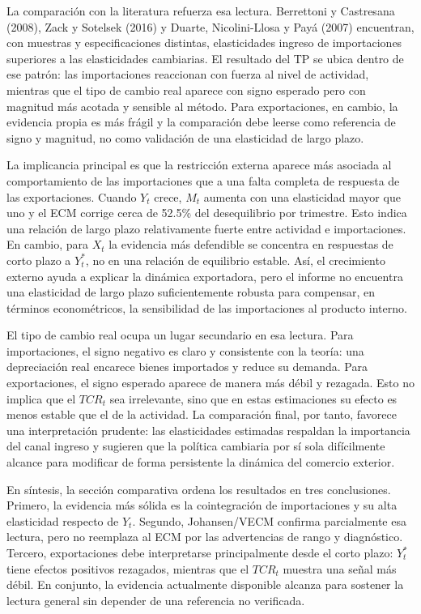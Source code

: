 \documentclass[11pt,a4paper]{article}
\begin{document}
	La comparación con la literatura refuerza esa lectura. Berrettoni y Castresana
	(2008), Zack y Sotelsek (2016) y Duarte, Nicolini-Llosa y Payá (2007)
	encuentran, con muestras y especificaciones distintas, elasticidades ingreso de
	importaciones superiores a las elasticidades cambiarias. El resultado del TP se
	ubica dentro de ese patrón: las importaciones reaccionan con fuerza al nivel de
	actividad, mientras que el tipo de cambio real aparece con signo esperado pero
	con magnitud más acotada y sensible al método. Para exportaciones, en cambio,
	la evidencia propia es más frágil y la comparación debe leerse como referencia
	de signo y magnitud, no como validación de una elasticidad de largo plazo.
	
	La implicancia principal es que la restricción externa aparece más asociada al
	comportamiento de las importaciones que a una falta completa de respuesta de las
	exportaciones. Cuando \(Y_t\) crece, \(M_t\) aumenta con una elasticidad mayor
	que uno y el ECM corrige cerca de 52.5\% del desequilibrio por trimestre. Esto
	indica una relación de largo plazo relativamente fuerte entre actividad e
	importaciones. En cambio, para \(X_t\) la evidencia más defendible se concentra
	en respuestas de corto plazo a \(Y_t^*\), no en una relación de equilibrio
	estable. Así, el crecimiento externo ayuda a explicar la dinámica exportadora,
	pero el informe no encuentra una elasticidad de largo plazo suficientemente
	robusta para compensar, en términos econométricos, la sensibilidad de las
	importaciones al producto interno.
	
	El tipo de cambio real ocupa un lugar secundario en esa lectura. Para
	importaciones, el signo negativo es claro y consistente con la teoría: una
	depreciación real encarece bienes importados y reduce su demanda. Para
	exportaciones, el signo esperado aparece de manera más débil y rezagada. Esto
	no implica que el \(TCR_t\) sea irrelevante, sino que en estas estimaciones su
	efecto es menos estable que el de la actividad. La comparación final, por
	tanto, favorece una interpretación prudente: las elasticidades estimadas
	respaldan la importancia del canal ingreso y sugieren que la política cambiaria
	por sí sola difícilmente alcance para modificar de forma persistente la
	dinámica del comercio exterior.
	
	En síntesis, la sección comparativa ordena los resultados en tres conclusiones.
	Primero, la evidencia más sólida es la cointegración de importaciones y su alta
	elasticidad respecto de \(Y_t\). Segundo, Johansen/VECM confirma parcialmente
	esa lectura, pero no reemplaza al ECM por las advertencias de rango y
	diagnóstico. Tercero, exportaciones debe interpretarse principalmente desde el
	corto plazo: \(Y_t^*\) tiene efectos positivos rezagados, mientras que el
	\(TCR_t\) muestra una señal más débil. En conjunto, la evidencia actualmente
	disponible alcanza para sostener la lectura general sin depender de una
	referencia no verificada.
	
\end{document}
